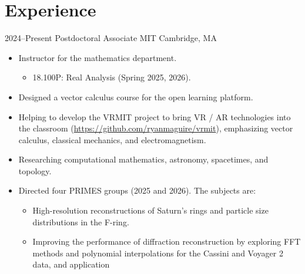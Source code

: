 \documentclass[a4paper,sans]{moderncv}
\begin{document}
    \section{Experience}
        \cventry%
            {2024--Present}
                {Postdoctoral Associate}
                {MIT}
                {Cambridge, MA}
                {}
                {%
                    \begin{itemize}
                        \item
                            Instructor for the mathematics department.
                            \begin{itemize}
                                \item
                                    18.100P: Real Analysis (Spring 2025, 2026).
                            \end{itemize}
                        \item
                            Designed a vector calculus course for the
                            open learning platform.
                        \item
                            Helping to develop the VRMIT project to bring
                            VR / AR technologies into the classroom
                            (\url{https://github.com/ryanmaguire/vrmit}),
                            emphasizing vector calculus, classical mechanics,
                            and electromagnetism.
                        \item
                            Researching computational mathematics, astronomy,
                            spacetimes, and topology.
                        \item
                            Directed four PRIMES groups (2025 and 2026). The
                            subjects are:
                            \begin{itemize}
                                \item
                                    High-resolution reconstructions of
                                    Saturn's rings and particle size
                                    distributions in the F-ring.
                                \item
                                    Improving the performance of diffraction
                                    reconstruction by exploring FFT methods
                                    and polynomial interpolations for the
                                    Cassini and Voyager 2 data, and application

\end{itemize}
\end{itemize}}
\end{document}
